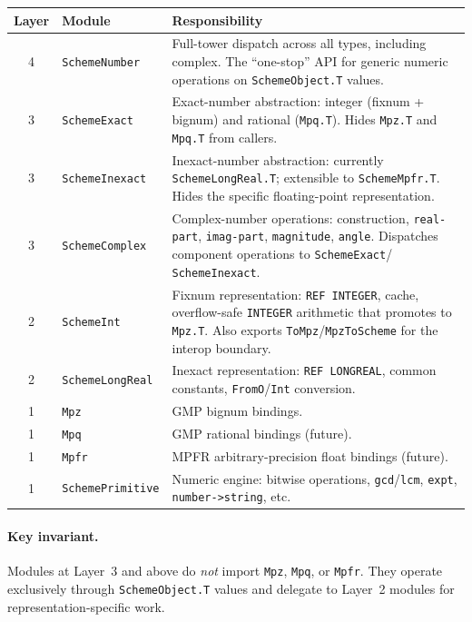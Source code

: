 \documentclass[12pt]{article}
\begin{document}
\begin{center}
\begin{tabular}{clp{7cm}}
\toprule
\textbf{Layer} & \textbf{Module} & \textbf{Responsibility} \\
\midrule
4 & {\tt SchemeNumber} & Full-tower dispatch across all types,
  including complex.  The ``one-stop'' API for generic numeric
  operations on {\tt SchemeObject.T} values. \\[4pt]
3 & {\tt SchemeExact} & Exact-number abstraction: integer (fixnum +
  bignum) and rational ({\tt Mpq.T}).  Hides {\tt Mpz.T} and
  {\tt Mpq.T} from callers. \\[4pt]
3 & {\tt SchemeInexact} & Inexact-number abstraction: currently
  {\tt SchemeLongReal.T}; extensible to {\tt SchemeMpfr.T}.
  Hides the specific floating-point representation. \\[4pt]
3 & {\tt SchemeComplex} & Complex-number operations: construction,
  {\tt real-part}, {\tt imag-part}, {\tt magnitude}, {\tt angle}.
  Dispatches component operations to {\tt SchemeExact}/{\tt
  SchemeInexact}. \\[4pt]
2 & {\tt SchemeInt} & Fixnum representation: {\tt REF INTEGER},
  cache, overflow-safe {\tt INTEGER} arithmetic that promotes
  to {\tt Mpz.T}.  Also exports {\tt ToMpz}/{\tt MpzToScheme}
  for the interop boundary. \\[4pt]
2 & {\tt SchemeLongReal} & Inexact representation: {\tt REF
  LONGREAL}, common constants, {\tt FromO}/{\tt Int} conversion. \\[4pt]
1 & {\tt Mpz} & GMP bignum bindings. \\[4pt]
1 & {\tt Mpq} & GMP rational bindings (future). \\[4pt]
1 & {\tt Mpfr} & MPFR arbitrary-precision float bindings (future). \\[4pt]
1 & {\tt SchemePrimitive} & Numeric engine: bitwise operations,
  {\tt gcd}/{\tt lcm}, {\tt expt}, {\tt number->string}, etc. \\
\bottomrule
\end{tabular}
\end{center}

\paragraph{Key invariant.}
Modules at Layer~3 and above do \emph{not} import {\tt Mpz},
{\tt Mpq}, or {\tt Mpfr}.  They operate exclusively through
{\tt SchemeObject.T} values and delegate to Layer~2 modules for
representation-specific work.
\end{document}
